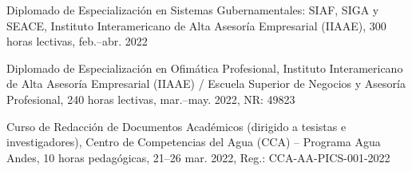 \begin{scholarship}









  {Diplomado de Especialización en Sistemas Gubernamentales: SIAF, SIGA y SEACE,
   Instituto Interamericano de Alta Asesoría Empresarial (IIAAE),
   300 horas lectivas, feb.--abr. 2022}

  {Diplomado de Especialización en Ofimática Profesional,
   Instituto Interamericano de Alta Asesoría Empresarial (IIAAE) /
   Escuela Superior de Negocios y Asesoría Profesional,
   240 horas lectivas, mar.--may. 2022, NR: 49823}

  {Curso de Redacción de Documentos Académicos (dirigido a tesistas e investigadores),
   Centro de Competencias del Agua (CCA) -- Programa Agua Andes,
   10 horas pedagógicas, 21--26 mar. 2022, Reg.: CCA-AA-PICS-001-2022}



\end{scholarship}
